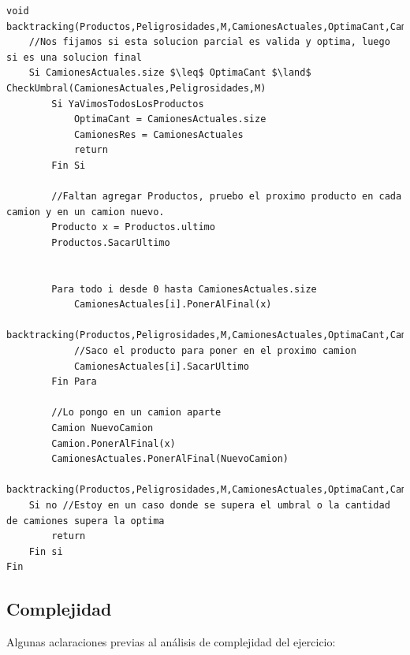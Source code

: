 \documentclass[10pt,a4paper]{article}
\begin{document}
\begin{lstlisting}[mathescape]
void backtracking(Productos,Peligrosidades,M,CamionesActuales,OptimaCant,CamionesRes)
	//Nos fijamos si esta solucion parcial es valida y optima, luego si es una solucion final
	Si CamionesActuales.size $\leq$ OptimaCant $\land$ CheckUmbral(CamionesActuales,Peligrosidades,M)
		Si YaVimosTodosLosProductos
			OptimaCant = CamionesActuales.size
			CamionesRes = CamionesActuales
			return
		Fin Si
		
		//Faltan agregar Productos, pruebo el proximo producto en cada camion y en un camion nuevo.
		Producto x = Productos.ultimo
		Productos.SacarUltimo


		Para todo i desde 0 hasta CamionesActuales.size
			CamionesActuales[i].PonerAlFinal(x)
			backtracking(Productos,Peligrosidades,M,CamionesActuales,OptimaCant,CamionesRes)
			//Saco el producto para poner en el proximo camion
			CamionesActuales[i].SacarUltimo
		Fin Para
		
		//Lo pongo en un camion aparte
		Camion NuevoCamion
		Camion.PonerAlFinal(x)
		CamionesActuales.PonerAlFinal(NuevoCamion)
		backtracking(Productos,Peligrosidades,M,CamionesActuales,OptimaCant,CamionesRes)
	Si no //Estoy en un caso donde se supera el umbral o la cantidad de camiones supera la optima
		return
	Fin si
Fin
\end{lstlisting}

\newpage
\subsection{Complejidad}

Algunas aclaraciones previas al análisis de complejidad del ejercicio:
\end{document}
